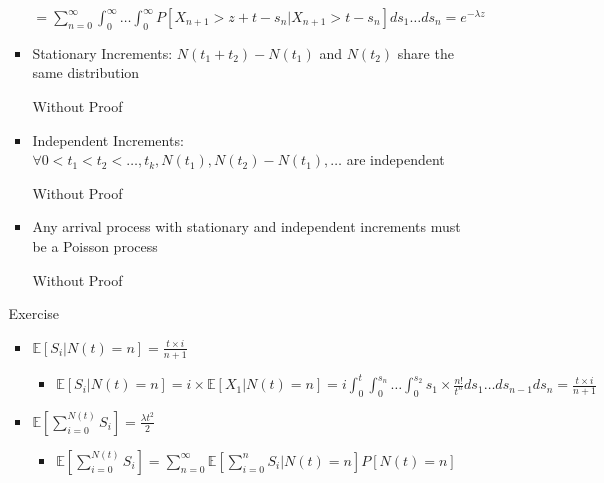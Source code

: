 \documentclass[a4paper]{article}
\begin{document}
\begin{itemize}
\begin{itemize}
\begin{itemize}
                        $= \sum_{n = 0}^\infty \int_0^\infty \dots \int_0^\infty P[X_{n+1}>z+t-s_n|X_{n+1} > t-s_n] ds_1 \dots ds_n = e^{-\lambda z}$
                    \item Stationary Increments: $N(t_1 + t_2) - N(t_1)$ and $N(t_2)$ share the same distribution

                        Without Proof
                    \item Independent Increments: $\forall 0 < t_1 < t_2 < \dots, t_k, N(t_1), N(t_2) - N(t_1), \dots$ are independent

                        Without Proof
                    \item Any arrival process with stationary and independent increments must be a Poisson process

                        Without Proof
                \end{itemize}
                Exercise
                \begin{itemize}
                    \item $\mathbb{E}[S_i|N(t) = n] = \frac{t \times i}{n+1}$
                        \begin{itemize}
                            \item $\mathbb{E}[S_i|N(t) = n] = i \times \mathbb{E}[X_1|N(t) = n] = i \int_0^t \int_0^{s_n} \dots \int_0^{s_2} s_1 \times \frac{n!}{t^n} ds_1 \dots ds_{n-1} ds_n = \frac{t \times i}{n+1}$
                        \end{itemize}
                    \item $\mathbb{E}[\sum_{i=0}^{N(t)} S_i] = \frac{\lambda t^2}{2}$
                        \begin{itemize}
                            \item $\mathbb{E}[\sum_{i=0}^{N(t)} S_i] = \sum_{n = 0}^\infty \mathbb{E}[\sum_{i=0}^n S_i|N(t) = n]P[N(t) = n]$


\end{itemize}
\end{itemize}
\end{itemize}
\end{itemize}
\end{document}
